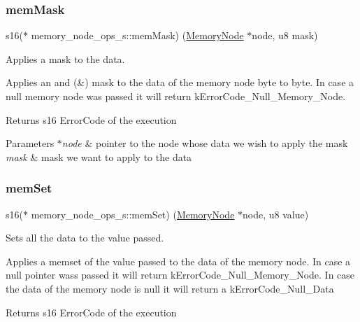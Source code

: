 \subsubsection{\texorpdfstring{mem\+Mask}{memMask}}
{\footnotesize\ttfamily s16($\ast$ memory\+\_\+node\+\_\+ops\+\_\+s\+::mem\+Mask) (\hyperlink{structmemory__node__s}{Memory\+Node} $\ast$node, u8 mask)}



Applies a mask to the data. 

Applies an and (\&) mask to the data of the memory node byte to byte. In case a null memory node was passed it will return k\+Error\+Code\+\_\+\+Null\+\_\+\+Memory\+\_\+\+Node. \begin{DoxyReturn}{Returns}
s16 Error\+Code of the execution 
\end{DoxyReturn}

\begin{DoxyParams}{Parameters}
{\em $\ast$node} & pointer to the node whose data we wish to apply the mask \\
\hline
{\em mask} & mask we want to apply to the data \\
\hline
\end{DoxyParams}
\mbox{\label{structmemory__node__ops__s_a25eeed1bed000ce61e20eb1889710be1}} 
\subsubsection{\texorpdfstring{mem\+Set}{memSet}}
{\footnotesize\ttfamily s16($\ast$ memory\+\_\+node\+\_\+ops\+\_\+s\+::mem\+Set) (\hyperlink{structmemory__node__s}{Memory\+Node} $\ast$node, u8 value)}



Sets all the data to the value passed. 

Applies a memset of the value passed to the data of the memory node. In case a null pointer wass passed it will return k\+Error\+Code\+\_\+\+Null\+\_\+\+Memory\+\_\+\+Node. In case the data of the memory node is null it will return a k\+Error\+Code\+\_\+\+Null\+\_\+\+Data

\begin{DoxyReturn}{Returns}
s16 Error\+Code of the execution 
\end{DoxyReturn}

